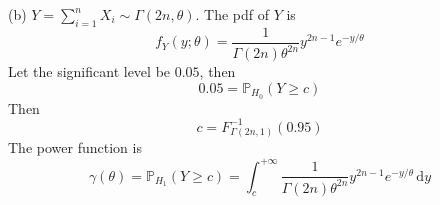 (b)
$Y=\sum_{i=1}^{n}X_i\sim\Gamma(2n,\theta)$. The pdf of $Y$ is
\[
f_{Y}(y;\theta)=\frac{1}{\Gamma(2n)\theta^{2n}}y^{2n-1}e^{ -y/\theta  }
\]
Let the significant level be $0.05$, then
\[
0.05=\mathbb{P}_{H_0}(Y\geq c)
\]
Then
\[
c=F^{-1}_{\Gamma(2n,1)}(0.95)
\]
The power function is
\[
\gamma(\theta)=\mathbb{P}_{H_1}(Y\geq c)= \int_{c}^{+\infty} \frac{1}{\Gamma(2n)\theta^{2n}}y^{2n-1}e^{ -y/\theta  } \, \mathrm{d}y
\]